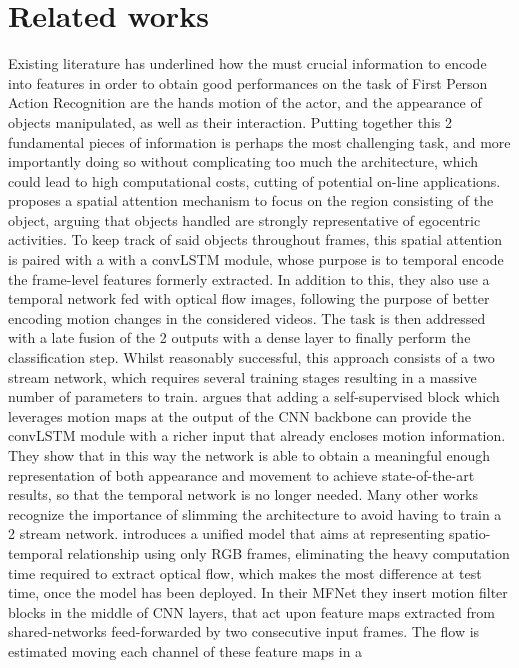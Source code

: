\documentclass[10pt,twocolumn,hidelinks,letterpaper]{article}
\begin{document}
\section{Related works}
Existing literature has underlined how the must crucial information to encode into features in order to obtain good performances on the task of First Person Action Recognition are the hands motion of the actor, and the appearance of objects manipulated, as well as their interaction. Putting together this 2 fundamental pieces of information is perhaps the most challenging task, and more importantly doing so without complicating too much the architecture, which could lead to high computational costs, cutting of potential on-line applications. \cite{egornn} proposes a spatial attention mechanism to focus on the region consisting of the object, arguing that objects handled are strongly representative of egocentric activities. To keep track of said objects throughout frames, this spatial attention is paired with a with a convLSTM module, whose purpose is to temporal encode the frame-level features formerly extracted. In addition to this, they also use a temporal network fed with optical flow images, following the purpose of better encoding motion changes in the considered videos. The task is then addressed with a late fusion of the 2 outputs with a dense layer to finally perform the classification step. Whilst reasonably successful, this approach consists of a two stream network, which requires several training stages
resulting in a massive number of parameters to train. \cite{sparnet} argues that adding a self-supervised block which leverages motion maps at the output of the CNN backbone can provide the convLSTM module with a richer input that already encloses motion information. They show that in this way the network is able to obtain a meaningful enough representation of both appearance and movement to achieve state-of-the-art results, so that the temporal network is no longer needed. Many other works recognize the importance of slimming the architecture to avoid having to train a 2 stream network. \cite{motfilt} introduces a unified model that aims at representing spatio-temporal relationship using only RGB frames, eliminating the heavy computation time required to extract optical flow, which makes the most difference at test time, once the model has been deployed. In their MFNet they insert motion filter blocks in the middle of CNN layers, that act upon feature maps extracted from shared-networks feed-forwarded by two consecutive input frames. The flow is estimated moving each channel of these feature maps in a
\end{document}
